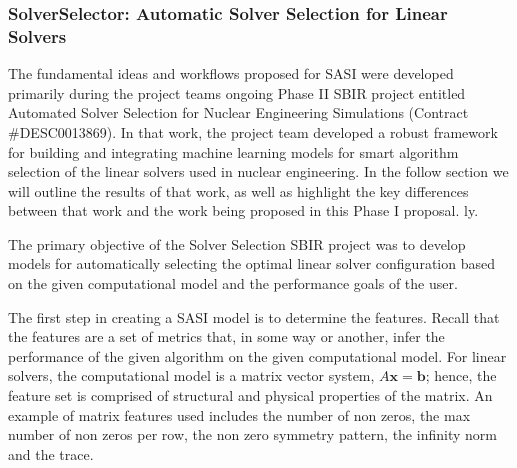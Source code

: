 \subsubsection{SolverSelector: Automatic Solver Selection for Linear Solvers} 

The fundamental ideas and workflows proposed for SASI were developed primarily during the project teams ongoing Phase II SBIR project entitled Automated Solver Selection for Nuclear Engineering Simulations (Contract \#DESC0013869). In that work, the project team developed a robust framework for building and integrating machine learning models for smart algorithm selection of the linear solvers used in nuclear engineering. In the follow section we will outline the results of that work, as well as highlight the key differences between that work and the work being proposed in this Phase I proposal.  
ly. 

The primary objective of the Solver Selection SBIR project was to develop models for automatically selecting the optimal linear solver configuration based on the given computational model and the performance goals of the user. 

The first step in creating a SASI model is to determine the features. Recall that the features are a set of metrics that, in some way or another, infer the performance of the given algorithm on the given computational model. For linear solvers, the computational model is a matrix vector system, $A\mathbf{x} = \mathbf{b}$; hence, the feature set is comprised of structural and physical properties of the matrix. An example of matrix features used includes the number of non zeros, the max number of non zeros per row, the non zero symmetry pattern, the infinity norm and the trace.  

%

